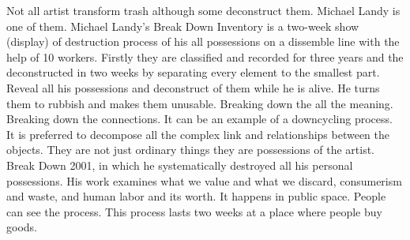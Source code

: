 
Not all artist transform trash although some deconstruct them. Michael Landy is one of them. Michael Landy's Break Down Inventory is a two-week show (display) of destruction process of his all possessions on a dissemble line with the help of 10 workers. Firstly they are classified and recorded for three years and the deconstructed in two weeks by separating every element to the smallest part. Reveal all his possessions and deconstruct of them while he is alive. He turns them to rubbish and makes them unusable. Breaking down the all the meaning. Breaking down the connections. It can be an example of a downcycling process. It is preferred to decompose all the complex link and relationships between the objects. They are not just ordinary things they are possessions of the artist. Break Down 2001, in which he systematically destroyed all his personal possessions. His work examines what we value and what we discard, consumerism and waste, and human labor and its worth. It happens in public space. People can see the process. This process lasts two weeks at a place where people buy goods.




